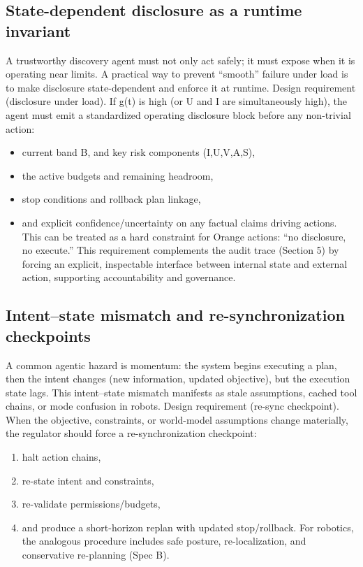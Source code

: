 \documentclass[11pt]{article}
\begin{document}
\subsection{State-dependent disclosure as a runtime invariant}
A trustworthy discovery agent must not only act safely; it must expose when it is operating near
limits. A practical way to prevent “smooth” failure under load is to make disclosure state-dependent
and enforce it at runtime.
Design requirement (disclosure under load). If g(t) is high (or U and I are simultaneously
high), the agent must emit a standardized operating disclosure block before any non-trivial action:
\begin{itemize}
\item 
current band B, and key risk components (I,U,V,A,S),
\item 
the active budgets and remaining headroom,
\item 
stop conditions and rollback plan linkage,
\item 
and explicit confidence/uncertainty on any factual claims driving actions.
This can be treated as a hard constraint for Orange actions: “no disclosure, no execute.”
This requirement complements the audit trace (Section 5) by forcing an explicit, inspectable
interface between internal state and external action, supporting accountability and governance.
\end{itemize}
\subsection{Intent–state mismatch and re-synchronization checkpoints}
A common agentic hazard is momentum: the system begins executing a plan, then the intent changes
(new information, updated objective), but the execution state lags. This intent–state mismatch
manifests as stale assumptions, cached tool chains, or mode confusion in robots.
Design requirement (re-sync checkpoint). When the objective, constraints, or world-model
assumptions change materially, the regulator should force a re-synchronization checkpoint:
\begin{enumerate}
\item halt action chains,
\item re-state intent and constraints,
\item re-validate permissions/budgets,
\item and produce a short-horizon replan with updated stop/rollback.
For robotics, the analogous procedure includes safe posture, re-localization, and conservative
re-planning (Spec B).
\end{enumerate}
\end{document}
